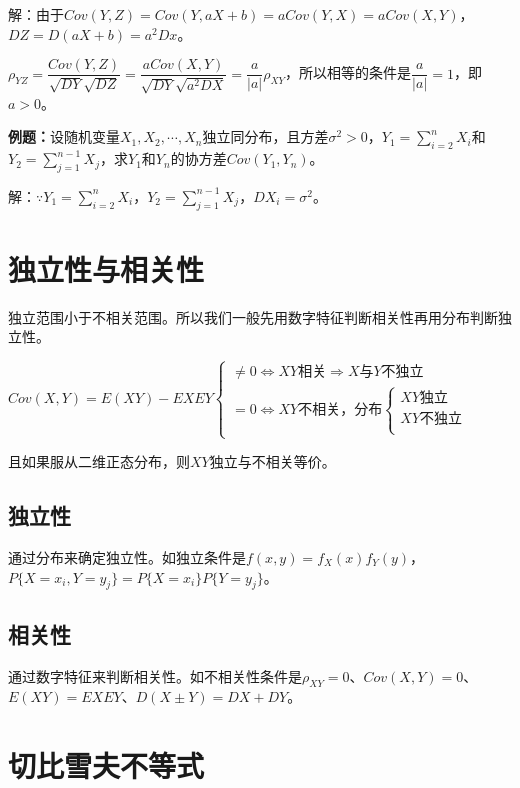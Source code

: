 \documentclass[UTF8, 12pt]{ctexart}
\begin{document}
解：由于$Cov(Y,Z)=Cov(Y,aX+b)=aCov(Y,X)=aCov(X,Y)$，$DZ=D(aX+b)=a^2Dx$。

$\rho_{YZ}=\dfrac{Cov(Y,Z)}{\sqrt{DY}\sqrt{DZ}}=\dfrac{aCov(X,Y)}{\sqrt{DY}\sqrt{a^2DX}}=\dfrac{a}{\vert a\vert}\rho_{XY}$，所以相等的条件是$\dfrac{a}{\vert a\vert}=1$，即$a>0$。

\textbf{例题：}设随机变量$X_1,X_2,\cdots,X_n$独立同分布，且方差$\sigma^2>0$，$Y_1=\sum\limits_{i=2}^nX_i$和$Y_2=\sum\limits_{j=1}^{n-1}X_j$，求$Y_1$和$Y_n$的协方差$Cov(Y_1,Y_n)$。

解：$\because Y_1=\sum\limits_{i=2}^nX_i$，$Y_2=\sum\limits_{j=1}^{n-1}X_j$，$DX_i=\sigma^2$。

\section{独立性与相关性}

独立范围小于不相关范围。所以我们一般先用数字特征判断相关性再用分布判断独立性。

$Cov(X,Y)=E(XY)-EXEY\left\{\begin{array}{l}
    \neq0\Leftrightarrow XY\text{相关}\Rightarrow X\text{与}Y\text{不独立} \\
    =0\Leftrightarrow XY\text{不相关，分布}\left\{\begin{array}{l}
        XY\text{独立} \\
        XY\text{不独立} \\
    \end{array}\right.
\end{array}\right.$

且如果服从二维正态分布，则$XY$独立与不相关等价。

\subsection{独立性}

通过分布来确定独立性。如独立条件是$f(x,y)=f_X(x)f_Y(y)$，$P\{X=x_i,Y=y_j\}=P\{X=x_i\}P\{Y=y_j\}$。

\subsection{相关性}

通过数字特征来判断相关性。如不相关性条件是$\rho_{XY}=0$、$Cov(X,Y)=0$、$E(XY)=EXEY$、$D(X\pm Y)=DX+DY$。

\section{切比雪夫不等式}
\end{document}
